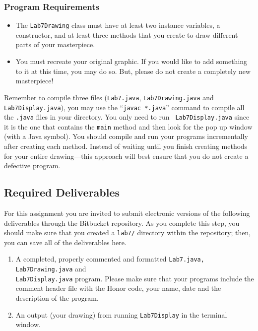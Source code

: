 \subsubsection*{Program Requirements}
\vspace{-0.05in}
\begin{itemize}
\item The {\tt Lab7Drawing}  class must have at least two instance variables, a constructor, and at least three methods
  that you create to draw different parts of your masterpiece. 
\item You must recreate your original graphic. If you would like to add something to it at this time, you may do so.
  But, please do not create a completely new masterpiece!
\end{itemize}
\vspace{-0.1in}

Remember to compile three files ({\tt Lab7.java}, {\tt Lab7Drawing.java} and {\tt Lab7Display.java}), you may use the
``{\tt javac *.java}'' command to compile all the {\tt .java} files in your directory. You only need to run {\tt
Lab7Display.java} since it is the one that contains the {\tt main} method and then look for the pop up window (with a
Java symbol). You should compile and run your programs incrementally after creating  each method. Instead of waiting
until you finish creating methods for your entire drawing---this approach will best ensure that you do not create a
defective program.

\vspace{-0.2in}
\subsection*{Required Deliverables}
\vspace{-0.05in}
For this assignment you are invited to submit electronic versions of the following deliverables through the Bitbucket repository. As you complete this step, you should make sure that you
created a {\tt lab7/} directory within the repository; then, you can save all of the deliverables here. 
\vspace{-0.05in}
\begin{enumerate}
	\item A completed, properly commented and formatted {\tt Lab7.java, Lab7Drawing.java} and \\ {\tt Lab7Display.java} program. Please make sure that your programs  include the comment header file with the Honor code, your name, date and the description of the program.

        \item An output (your drawing) from running {\tt Lab7Display} in the terminal window.
\end{enumerate}
\vspace{-0.1in}

